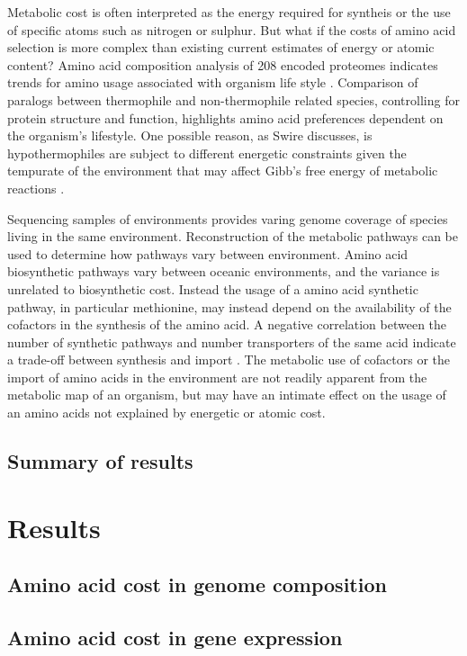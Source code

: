 Metabolic cost is often interpreted as the energy required for syntheis or the use of specific atoms such as nitrogen or sulphur. But what if the costs of amino acid selection is more complex than existing current estimates of energy or atomic content? Amino acid composition analysis of 208 encoded proteomes indicates trends for amino usage associated with organism life style \cite{tekaia}. Comparison of paralogs between thermophile and non-thermophile related species, controlling for protein structure and function, highlights amino acid preferences dependent on the organism's lifestyle. One possible reason, as Swire discusses, is hypothermophiles are subject to different energetic constraints given the tempurate of the environment that may affect Gibb's free energy of metabolic reactions \cite{swire2006}.

Sequencing samples of environments provides varing genome coverage of species living in the same environment. Reconstruction of the metabolic pathways can be used to determine how pathways vary between environment. Amino acid biosynthetic pathways vary between oceanic environments, and the variance is unrelated to biosynthetic cost. Instead the usage of a amino acid synthetic pathway, in particular methionine, may instead depend on the availability of the cofactors in the synthesis of the amino acid. A negative correlation between the number of synthetic pathways and number transporters of the same acid indicate a trade-off between synthesis and import \cite{gianoulis2009}. The metabolic use of cofactors or the import of amino acids in the environment are not readily apparent from the metabolic map of an organism, but may have an intimate effect on the usage of an amino acids not explained by energetic or atomic cost.

\subsection{Summary of results}

\section{Results}

\subsection{Amino acid cost in genome composition}

\subsection{Amino acid cost in gene expression}

